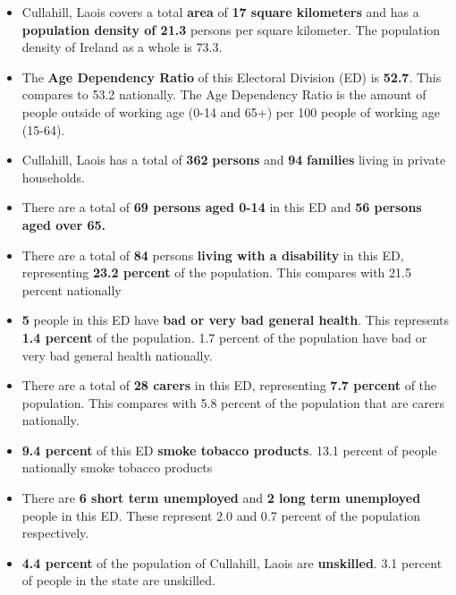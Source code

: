 \documentclass{article}
\begin{document}
\begin{itemize}

\item Cullahill, Laois covers a total \textbf{area} of  \textbf{17 square kilometers} and has a \textbf{population density of 21.3} persons per square kilometer. The population density of Ireland as a whole is  73.3. 

\item The \textbf{Age Dependency Ratio} of this Electoral Division (ED) is  \textbf{52.7}. This compares to 53.2 nationally. The Age Dependency Ratio is the amount of people outside of working age (0-14 and 65+) per 100 people of working age (15-64). 

\item Cullahill, Laois has a total of \textbf{362} \textbf{persons} and  \textbf{94} \textbf{families} living in private households.

\item There are a total of \textbf{69 persons aged 0-14} in this ED and \textbf{56 persons aged over 65.} 

\item There are a total of \textbf{84} persons \textbf{living with a disability} in this ED, representing \textbf{23.2 percent} of the population. This compares with  21.5 percent nationally

\item \textbf{5} people in this ED have \textbf{bad or very bad general health}. This represents \textbf{1.4 percent} of the population. 1.7 percent of the population have bad or very bad general health nationally. 

\item There are a total of \textbf{28 carers} in this ED, representing \textbf{7.7 percent} of the population. This compares with 5.8 percent of the population that are carers nationally. 

\item \textbf{9.4 percent} of this ED \textbf{smoke tobacco products}. 13.1 percent of people nationally smoke tobacco products

\item There are \textbf{6 short term unemployed} and \textbf{2 long term unemployed} people in this ED. These represent 2.0 and 0.7 percent of the population respectively.

\item  \textbf{4.4 percent} of the population of Cullahill, Laois are \textbf{unskilled}. 3.1 percent of people in the state are unskilled.


\end{itemize}
\end{document}
